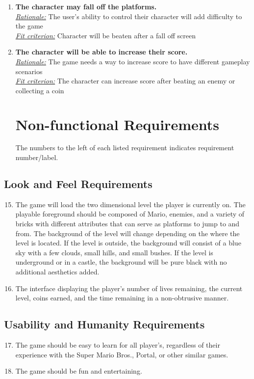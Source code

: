 \documentclass[12pt, titlepage]{article}
\begin{document}
\begin{enumerate}
\item \textbf{The character may fall off the platforms.} \\
\underline{\textit{Rationale:}} The user's ability to control their character will add difficulty to the game\\
\underline{\textit{Fit criterion:}} Character will be beaten after a fall off screen\\

\item \textbf{The character will be able to increase their score.} \\
\underline{\textit{Rationale:}} The game needs a way to increase score to have different gameplay scenarios\\
\underline{\textit{Fit criterion:}} The character can increase score after beating an enemy or collecting a coin\\
\section{Non-functional Requirements}
The numbers to the left of each listed requirement indicates requirement number/label.
\end{enumerate}

\subsection{Look and Feel Requirements}
\begin{enumerate}
\setcounter{enumi}{14}
	\item The game will load the two dimensional level the player is currently on. The playable foreground should be composed of Mario, enemies, and a variety of bricks with different attributes that can serve as platforms to jump to and from. The background of the level will change depending on the where the level is located. If the level is outside, the background will consist of a blue sky with a few clouds, small hills, and small bushes. If the level is underground or in a castle, the background will be pure black with no additional aesthetics added.
	\item The interface displaying the player's number of lives remaining, the current level, coins earned, and the time remaining in a non-obtrusive manner.
\end{enumerate}

\subsection{Usability and Humanity Requirements}
\begin{enumerate}
\setcounter{enumi}{16}
	\item The game should be easy to learn for all player's, regardless of their experience with the Super Mario Bros., Portal, or other similar games.
	\item The game should be fun and entertaining.
\end{enumerate}
\end{document}
